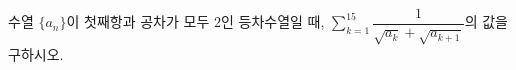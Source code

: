 \hspace*{2mm}\begin{minipage}[t]{\dimexpr\linewidth-2mm\relax}\vspace{0pt}
수열 $\{a_n\}$이 첫째항과 공차가 모두 $2$인 등차수열일 때, $\displaystyle\sum_{k=1}^{15}\dfrac{1}{\sqrt{a_k}+\sqrt{a_{k+1}}}$의 값을 구하시오.\end{minipage}
